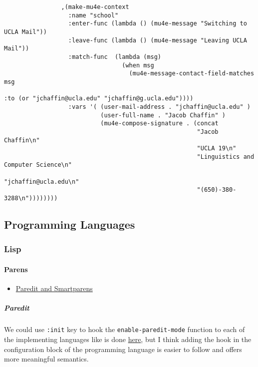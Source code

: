 \documentclass[11pt]{article}
\begin{document}
\begin{verbatim}
                ,(make-mu4e-context
                  :name "school"
                  :enter-func (lambda () (mu4e-message "Switching to UCLA Mail"))
                  :leave-func (lambda () (mu4e-message "Leaving UCLA Mail"))
                  :match-func  (lambda (msg)
                                 (when msg
                                   (mu4e-message-contact-field-matches msg
                                                                       :to (or "jchaffin@ucla.edu" "jchaffin@g.ucla.edu"))))
                  :vars '( (user-mail-address . "jchaffin@ucla.edu" )
                           (user-full-name . "Jacob Chaffin" )
                           (mu4e-compose-signature . (concat
                                                      "Jacob Chaffin\n"
                                                      "UCLA 19\n"
                                                      "Linguistics and Computer Science\n"
                                                      "jchaffin@ucla.edu\n"
                                                      "(650)-380-3288\n"))))))))

\end{verbatim}

\subsection*{Programming Languages}
\label{sec:org01758f4}
\subsubsection*{Lisp}
\label{sec:orgd153015}
\paragraph*{Parens}
\label{sec:org866780f}

\begin{itemize}
\item \href{https://github.com/Fuco1/smartparens/wiki/Paredit-and-smartparens}{Paredit and Smartparens}
\end{itemize}

\subparagraph*{Paredit}
\label{sec:org9071adf}

We could use \texttt{:init} key to hook the \texttt{enable-paredit-mode}
function to each of the implementing languages like is
done \href{https://github.com/tomjakubowski/.emacs.d/blob/master/init.el}{here}, but I think adding the hook in the configuration
block of the programming language is easier to follow and
offers more meaningful semantics.
\end{document}
